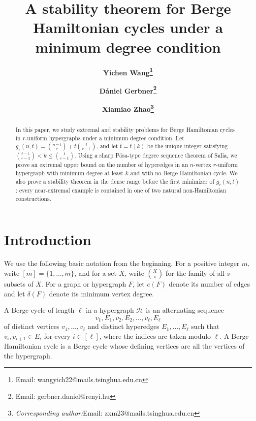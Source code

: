 \documentclass[12pt]{article}
\title{A stability theorem for Berge Hamiltonian cycles under a minimum degree condition}
\author[1]{\small\bf Yichen Wang\thanks{Email: wangyich22@mails.tsinghua.edu.cn}}
\author[2]{\small\bf D\'aniel Gerbner\thanks{Email: gerbner.daniel@renyi.hu
}}
\author[1]{\small\bf Xiamiao Zhao\thanks{\textit{Corresponding author:}Email: zxm23@mails.tsinghua.edu.cn}}
\affil[1]{\small Department of Mathematical Sciences, Tsinghua University, Beijing, P.R. China.}
\affil[2]{\small HUN-REN Alfr\'ed R\'enyi Institute of Mathematics, Budapest, Hungary.}
\date{}
\newcommand{\Hcal}{\mathcal H}
\begin{document}
\maketitle

\begin{abstract}
In this paper,
we study extremal and stability problems for Berge Hamiltonian cycles in
$r$-uniform hypergraphs under a minimum degree condition.  Let
       $ g_r(n,t)=\binom{n-t}{r}+t\binom{t}{r-1}$,
and let $t=t(k)$ be the unique integer satisfying
$\binom{t-1}{r-1}<k\le \binom{t}{r-1}$.  Using a sharp
P\'osa-type degree sequence theorem
of Salia, we prove an extremal upper bound on the number of hyperedges in
an $n$-vertex $r$-uniform hypergraph with minimum degree at least $k$ and
with no Berge Hamiltonian cycle.  We also prove a stability theorem in the
dense range before the first minimizer of $g_r(n,t)$: every near-extremal
example is contained in one of two natural non-Hamiltonian constructions.
\end{abstract}

\section{Introduction}

We use the following basic notation from the beginning.  For a positive
integer $m$, write $[m]=\{1,\ldots,m\}$, and for a set $X$, write
$\binom{X}{s}$ for the family of all $s$-subsets of $X$.  For a graph or
hypergraph $F$, let $e(F)$ denote its number of edges and let
$\delta(F)$ denote its minimum vertex degree.

A Berge cycle of length $\ell$ in a hypergraph $\Hcal$ is an alternating
sequence
$$
        v_1,E_1,v_2,E_2,\ldots,v_\ell,E_\ell
$$
of distinct vertices $v_1,\ldots,v_\ell$ and distinct hyperedges
$E_1,\ldots,E_\ell$ such that $v_i,v_{i+1}\in E_i$ for every
$i\in[\ell]$, where the indices are taken modulo $\ell$.  A Berge
Hamiltonian cycle is a Berge cycle whose defining vertices are all the
vertices of the hypergraph.
\end{document}
